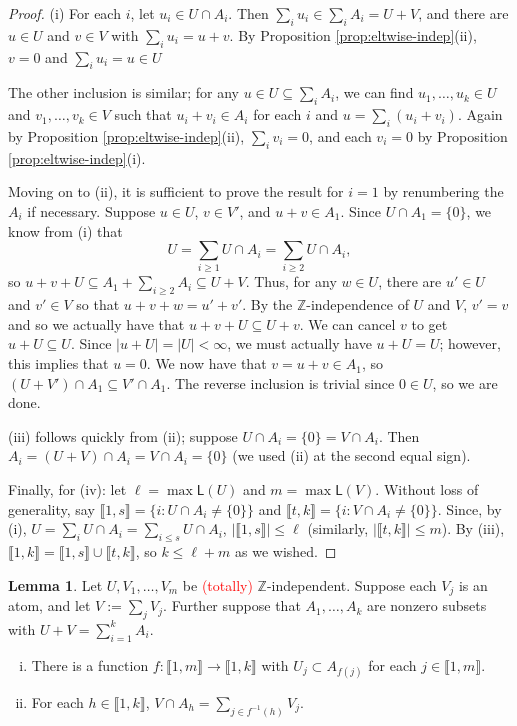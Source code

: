 \documentclass{report}
\newcommand{\ZZ}{\mathbb{Z}}
\newcommand{\llb}{\llbracket}
\newcommand{\rrb}{\rrbracket}
\renewcommand{\:}{\text{:}}
\theoremstyle{definition}
\newtheorem{lemma}[defn]{Lemma}
\begin{document}
\begin{proof}
(i) For each $i$, let $u_i\in U\cap A_i$.
Then $\sum_i u_i \in \sum_i A_i = U+V$, and there are $u\in U$ and $v\in V$ with $\sum_i u_i = u+v$.
By Proposition \ref{prop:eltwise-indep}(ii), $v = 0$ and $\sum_i u_i = u \in U$

The other inclusion is similar; for any $u\in U \subseteq \sum_i A_i$, we can find $u_1,\dots,u_k\in U$ and $v_1,\dots, v_k\in V$ such that $u_i+v_i\in A_i$ for each $i$ and $u = \sum_i (u_i + v_i)$.
Again by Proposition \ref{prop:eltwise-indep}(ii), $\sum_i v_i = 0$, and each $v_i = 0$ by Proposition \ref{prop:eltwise-indep}(i).

Moving on to (ii), it is sufficient to prove the result for $i=1$ by renumbering the $A_i$ if necessary.
Suppose $u\in U$, $v\in V'$, and $u+v\in A_1$.
Since $U\cap A_1 = \{0\}$, we know from (i) that
\[ U = \sum_{i\ge 1} U\cap A_i = \sum_{i\ge 2} U\cap A_i, \]
so $u+v + U \subseteq A_1 + \sum_{i\ge 2} A_i \subseteq U+V$.
Thus, for any $w\in U$, there are $u'\in U$ and $v'\in V$ so that $u+v+w = u'+v'$.
By the $\ZZ$-independence of $U$ and $V$, $v' = v$ and so we actually have that $u+v+U \subseteq U + v$.
We can cancel $v$ to get $u+U \subseteq U$.
Since $|u+U| = |U| <\infty$, we must actually have $u+U = U$; however, this implies that $u = 0$.
We now have that $v = u+v \in A_1$, so $(U+V')\cap A_1 \subseteq V' \cap A_1$.
The reverse inclusion is trivial since $0\in U$, so we are done.

(iii) follows quickly from (ii); suppose $U\cap A_i = \{0\} = V\cap A_i$.
Then $A_i = (U+V)\cap A_i = V\cap A_i = \{0\}$ (we used (ii) at the second equal sign).

Finally, for (iv): let $\ell = \max \mathsf{L}(U)$ and $m = \max\mathsf{L}(V)$.
Without loss of generality, say $\llb 1,s \rrb = \{i: U\cap A_i \neq \{0\} \}$ and $\llb t,k \rrb = \{i: V\cap A_i \neq \{0\} \}$.
Since, by (i), $U = \sum_i U\cap A_i = \sum_{i\le s} U \cap A_i$, $| \llb 1,s \rrb | \le \ell$ (similarly, $|\llb t,k \rrb| \le m$).
By (iii), $\llb 1,k \rrb = \llb 1,s \rrb \cup \llb t,k \rrb$, so $k \le \ell + m$ as we wished.
\end{proof}

\begin{lemma} \label{lem:indep-atom-decomp}
Let $U, V_1,\dots, V_m$ be \textcolor{red}{(totally)} $\ZZ$-independent.
Suppose each $V_j$ is an atom, and let $V := \sum_j V_j$.
Further suppose that $A_1,\dots, A_k$ are nonzero subsets with $U+V = \sum_{i=1}^k A_i$.
\begin{enumerate}[(i)]
	\item There is a function $f: \llb 1,m \rrb \to \llb 1,k \rrb$ with $U_j \subset A_{f(j)}$ for each $j\in \llb 1,m\rrb$.
	\item For each $h\in \llb 1,k\rrb$, $V\cap A_h = \sum_{j\in f^{-1}(h)} V_j$.
\end{enumerate}
\end{lemma}
\end{document}
